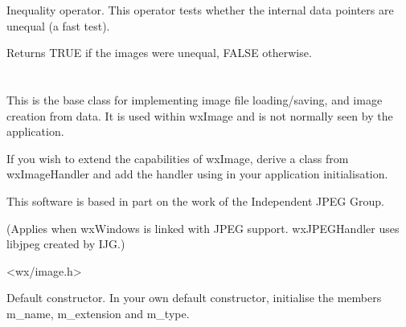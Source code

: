 

Inequality operator. This operator tests whether the internal data pointers are
unequal (a fast test).




Returns TRUE if the images were unequal, FALSE otherwise.

\section{}\label{wximagehandler}

This is the base class for implementing image file loading/saving, and image creation from data.
It is used within wxImage and is not normally seen by the application.

If you wish to extend the capabilities of wxImage, derive a class from wxImageHandler
and add the handler using  in your
application initialisation.


This software is based in part on the work of the Independent JPEG Group.

(Applies when wxWindows is linked with JPEG support. wxJPEGHandler uses libjpeg
created by IJG.)




<wx/image.h>




\label{wximagehandlerconstr}


Default constructor. In your own default constructor, initialise the members
m\_name, m\_extension and m\_type.



